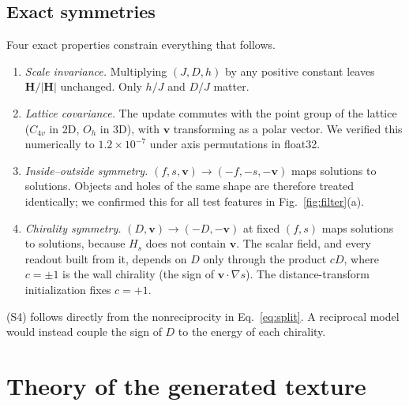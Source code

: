 \documentclass[11pt,a4paper]{article}
\newcommand{\vv}{\bm v}
\begin{document}
\subsection{Exact symmetries}\label{subsec:symm}
Four exact properties constrain everything that follows.
\begin{enumerate}[label=(S\arabic*),leftmargin=2.4em,itemsep=0.1em]
\item \emph{Scale invariance.} Multiplying $(J,D,h)$ by any positive constant leaves $\bm H/|\bm H|$ unchanged. Only $h/J$ and $D/J$ matter.
\item \emph{Lattice covariance.} The update commutes with the point group of the lattice ($C_{4v}$ in 2D, $O_h$ in 3D), with $\vv$ transforming as a polar vector. We verified this numerically to $1.2\times10^{-7}$ under axis permutations in float32.
\item \emph{Inside--outside symmetry.} $(f,s,\vv)\to(-f,-s,-\vv)$ maps solutions to solutions. Objects and holes of the same shape are therefore treated identically; we confirmed this for all test features in Fig.~\ref{fig:filter}(a).
\item \emph{Chirality symmetry.} $(D,\vv)\to(-D,-\vv)$ at fixed $(f,s)$ maps solutions to solutions, because $H_s$ does not contain $\vv$. The scalar field, and every readout built from it, depends on $D$ only through the product $cD$, where $c=\pm1$ is the wall chirality (the sign of $\vv\cdot\nabla s$). The distance-transform initialization fixes $c=+1$.
\end{enumerate}
(S4) follows directly from the nonreciprocity in Eq.~\eqref{eq:split}. A reciprocal model would instead couple the sign of $D$ to the energy of each chirality.

\section{Theory of the generated texture}\label{sec:theory}
\end{document}
